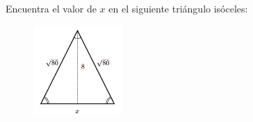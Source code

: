 Encuentra el valor de $x$ en el siguiente triángulo isóceles:
\begin{figure}[H]
    \begin{center}
        \includegraphics[width=0.3\textwidth]{../images/pitagoras9.png}
    \end{center}
    \caption{}
    \label{fig:pitagoras9}
\end{figure}
